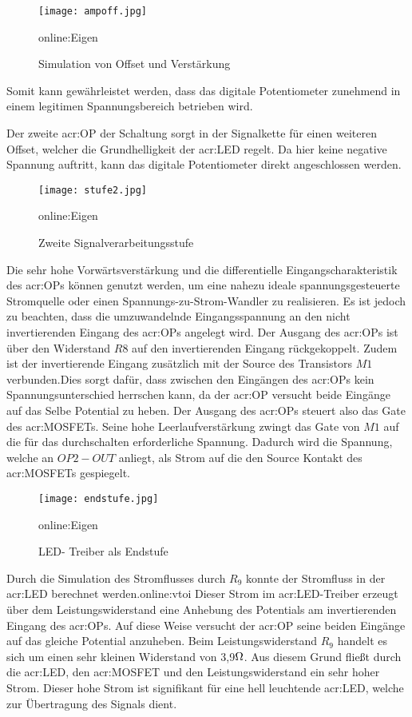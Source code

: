 \begin{figure}[H]
	\centering
	\texttt{[image: ampoff.jpg]}
	\caption[Simulation von Offset und Verstärkung]{Simulation von Offset und Verstärkung} \gls{online:Eigen}
	\label{fig:ampoff}
\end{figure}

Somit kann gewährleistet werden, dass das digitale Potentiometer zunehmend in einem legitimen Spannungsbereich betrieben wird.

Der zweite \gls{acr:OP} der Schaltung sorgt in der Signalkette für einen weiteren
Offset, welcher die Grundhelligkeit der \gls{acr:LED} regelt. Da hier keine negative Spannung auftritt, kann das digitale Potentiometer direkt angeschlossen werden.

\begin{figure}[H]
	\centering
	\texttt{[image: stufe2.jpg]}
	\caption[Zweite Signalverarbeitungsstufe]{Zweite Signalverarbeitungsstufe} \gls{online:Eigen}
	\label{fig:stufe2}
\end{figure}


Die sehr hohe Vorwärtsverstärkung und die differentielle Eingangscharakteristik des \gls{acr:OP}s können genutzt werden, um eine nahezu ideale spannungsgesteuerte Stromquelle oder einen Spannungs-zu-Strom-Wandler zu realisieren. Es ist jedoch zu beachten, dass die umzuwandelnde Eingangsspannung an den nicht invertierenden Eingang des \gls{acr:OP}s angelegt wird. Der Ausgang des \gls{acr:OP}s ist über den Widerstand $R{8}$ auf den invertierenden Eingang rückgekoppelt.  Zudem ist der invertierende Eingang zusätzlich mit der Source des Transistors $M{1}$ verbunden.Dies sorgt dafür, dass zwischen den Eingängen des \gls{acr:OP}s kein Spannungsunterschied herrschen kann, da der \gls{acr:OP} versucht beide Eingänge auf das Selbe Potential zu heben. Der Ausgang des \gls{acr:OP}s steuert also das Gate des \gls{acr:MOSFET}s. Seine hohe Leerlaufverstärkung zwingt das Gate von $M{1}$ auf die für das durchschalten erforderliche Spannung. Dadurch wird die Spannung, welche an $OP2-OUT$ anliegt, als Strom auf die den Source Kontakt des \gls{acr:MOSFET}s gespiegelt.

\begin{figure}[H]
	\centering
	\texttt{[image: endstufe.jpg]}
	\caption[LED- Treiber als Endstufe]{LED- Treiber als Endstufe} \gls{online:Eigen}
	\label{fig:endstufe}
\end{figure}

Durch die Simulation des Stromflusses durch $R_9$ konnte der Stromfluss in der \gls{acr:LED} berechnet werden.\gls{online:vtoi} Dieser Strom im \gls{acr:LED}-Treiber erzeugt über dem Leistungswiderstand eine Anhebung des Potentials am invertierenden Eingang des \gls{acr:OP}s. Auf diese Weise versucht der \gls{acr:OP} seine beiden Eingänge auf das gleiche Potential anzuheben. Beim Leistungswiderstand $R_{9}$ handelt es sich um einen sehr kleinen Widerstand von 3,9$\ohm$. Aus diesem Grund fließt durch die \gls{acr:LED}, den \gls{acr:MOSFET} und den Leistungswiderstand ein sehr hoher Strom. Dieser hohe Strom ist signifikant für eine hell leuchtende \gls{acr:LED}, welche zur Übertragung des Signals dient.



